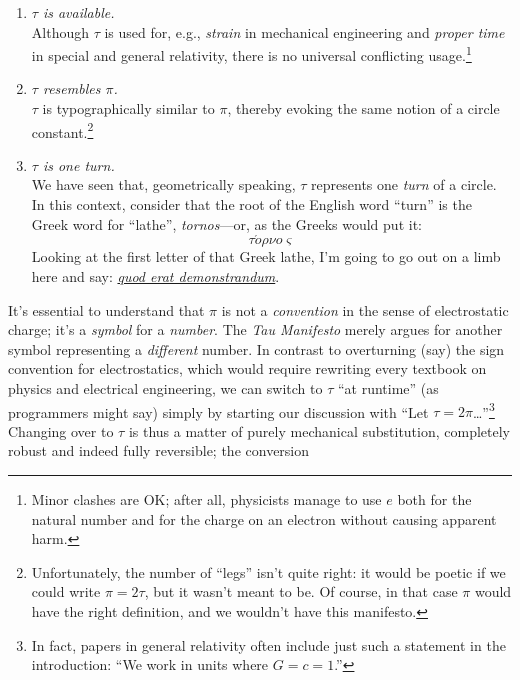 \documentclass{article}
\begin{document}
\begin{enumerate}
  \item \emph{$\tau$ is available.} \\ Although $\tau$ is used for, e.g., \emph{strain} in mechanical engineering and \emph{proper time} in special and general relativity, there is no universal conflicting usage.\footnote{Minor clashes are OK; after all, physicists manage to use $e$ both for the natural number and for the charge on an electron without causing apparent harm.} 
  
  \item \emph{$\tau$ resembles $\pi$.} \\ $\tau$ is typographically similar to $\pi$, thereby evoking the same notion of a circle constant.\footnote{Unfortunately, the number of ``legs'' isn't quite right: it would be poetic if we could write $\pi = 2\tau$, but it wasn't meant to be. Of course, in that case $\pi$ would have the right definition, and we wouldn't have this manifesto.}
  
  \item \emph{$\tau$ is one turn.} \\ We have seen that, geometrically speaking, $\tau$ represents one \emph{turn} of a circle. In this context, consider that the root of the English word ``turn'' is the Greek word for ``lathe'', \emph{tornos}---or, as the Greeks would put it: \[ \tau \acute{o}\rho\nu o\varsigma \] \noindent Looking at the first letter of that Greek lathe, I'm going to go out on a limb here and say: \href{http://en.wikipedia.org/wiki/Q.E.D.}{\emph{quod erat demonstrandum}}.
\end{enumerate}


It's essential to understand that $\pi$ is not a \emph{convention} in the sense of electrostatic charge; it's a \emph{symbol} for a \emph{number}. The \emph{Tau Manifesto} merely argues for another symbol representing a \emph{different} number. In contrast to overturning (say) the sign convention for electrostatics, which would require rewriting every textbook on physics and electrical engineering, we can switch to $\tau$ ``at runtime'' (as programmers might say) simply by starting our discussion with ``Let $\tau = 2\pi$\ldots''\footnote{In fact, papers in general relativity often include just such a statement in the introduction: ``We work in units where $G = c = 1$.''} Changing over to $\tau$ is thus a matter of purely mechanical substitution, completely robust and indeed fully reversible; the conversion
\end{document}
